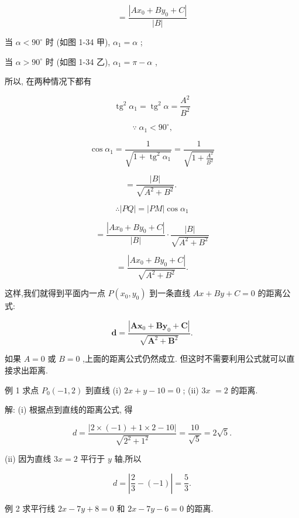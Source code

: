 \documentclass[lang=cn,newtx,10pt,scheme=chinese]{elegantbook}
\begin{document}
\[
  = \frac{\left| A{x}_{0} + B{y}_{0} + C\right| }{\left| B\right| }
\]

当 \(\alpha < {90}^{ \circ }\) 时 (如图 1-34 甲), \({\alpha }_{1} = \alpha\) ;

当 \(\alpha > {90}^{ \circ }\) 时 (如图 1-34 乙), \({\alpha }_{1} = \pi - \alpha\) ,

所以, 在两种情况下都有

\[
    {\operatorname{tg}}^{2}{\alpha }_{1} = {\operatorname{tg}}^{2}\alpha = \frac{{A}^{2}}{{B}^{2}}
\]

\[
  \because \;{\alpha }_{1} < {90}^{ \circ }\text{,}
\]

\[
  \cos {\alpha }_{1} = \frac{1}{\sqrt{1 + {\operatorname{tg}}^{2}{\alpha }_{1}}} = \frac{1}{\sqrt{1 + \frac{{A}^{2}}{{B}^{2}}}}
\]

\[
  = \frac{\left| B\right| }{\sqrt{{A}^{2} + {B}^{2}}}\text{. }
\]

\[
  \therefore \left| {PQ}\right| = \left| {PM}\right| \cos {\alpha }_{1}
\]

\[
  = \frac{\left| A{x}_{0} + B{y}_{0} + C\right| }{\left| B\right| } \cdot \frac{\left| B\right| }{\sqrt{{A}^{2} + {B}^{2}}}
\]

\[
  = \frac{\left| A{x}_{0} + B{y}_{0} + C\right| }{\sqrt{{A}^{2} + {B}^{2}}}.
\]
\begin{corollary}[点到直线的距离公式]
这样,我们就得到平面内一点 \(P\left( {{x}_{0},{y}_{0}}\right)\) 到一条直线 \({Ax} + {By} + C = 0\) 的距离公式:

\[
  \mathbf{d} = \frac{\left| \mathbf{A}{\mathbf{x}}_{0} + \mathbf{B}{\mathbf{y}}_{0} + \mathbf{C}\right| }{\sqrt{{\mathbf{A}}^{2} + {\mathbf{B}}^{2}}}.
\]

如果 \(A = 0\) 或 \(B = 0\) ,上面的距离公式仍然成立. 但这时不需要利用公式就可以直接求出距离.
\end{corollary}
例 1 求点 \({P}_{0}\left( {-1,2}\right)\) 到直线 (i) \({2x} + y - {10} = 0\) ; (ii) \({3x}\) \(= 2\) 的距离.

解: (i) 根据点到直线的距离公式, 得

\[
  d = \frac{\left| 2 \times \left( -1\right) + 1 \times 2 - {10}\right| }{\sqrt{{2}^{2} + {1}^{2}}} = \frac{10}{\sqrt{5}} = 2\sqrt{5}.
\]

(ii) 因为直线 \({3x} = 2\) 平行于 \(y\) 轴,所以

\[
  d = \left| {\frac{2}{3} - \left( {-1}\right) }\right| = \frac{5}{3}.
\]

例 2 求平行线 \({2x} - {7y} + 8 = 0\) 和 \({2x} - {7y} - 6 = 0\) 的距离.
\end{document}
